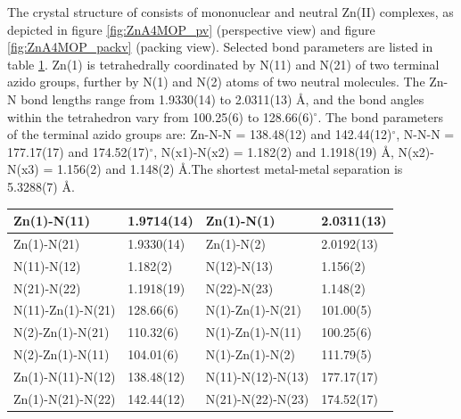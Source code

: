 The crystal structure of \ce{[Zn(N_3)_2(4-MeOpy)_2]} consists of mononuclear and neutral Zn(II) complexes, as depicted in figure \ref{fig:ZnA4MOP_pv} (perspective view) and figure \ref{fig:ZnA4MOP_packv} (packing view). Selected bond parameters are listed in table \ref{batab:ZnA4MOP}.  Zn(1) is tetrahedrally coordinated by N(11) and N(21) of two terminal azido groups, further by N(1) and N(2) atoms of two neutral  molecules. The Zn-N bond lengths range from 1.9330(14) to 2.0311(13) \AA, and the bond angles within the  tetrahedron vary from 100.25(6) to 128.66(6)$^\circ$. The bond parameters of the terminal azido groups are: Zn-N-N = 138.48(12) and 142.44(12)$^\circ$, N-N-N = 177.17(17) and 174.52(17)$^\circ$, N(x1)-N(x2) = 1.182(2) and 1.1918(19) \AA, N(x2)-N(x3) = 1.156(2) and 1.148(2) \AA.The shortest metal-metal separation is 5.3288(7) \AA. 

\begin{table}[htpb!]
\centering
{}
\begin{tabular}{|l|l|l|l|}
\hline
Zn(1)-N(11) & 1.9714(14) & Zn(1)-N(1) & 2.0311(13)\\
\hline
Zn(1)-N(21) & 1.9330(14) & Zn(1)-N(2) & 2.0192(13)\\
\hline
N(11)-N(12) & 1.182(2) & N(12)-N(13) & 1.156(2)\\
\hline
N(21)-N(22) & 1.1918(19) & N(22)-N(23) & 1.148(2)\\
\hline
\hline
N(11)-Zn(1)-N(21) & 128.66(6) & N(1)-Zn(1)-N(21) & 101.00(5)\\
\hline
N(2)-Zn(1)-N(21) & 110.32(6) & N(1)-Zn(1)-N(11) & 100.25(6)\\
\hline
N(2)-Zn(1)-N(11) & 104.01(6) & N(1)-Zn(1)-N(2) & 111.79(5)\\
\hline
Zn(1)-N(11)-N(12) & 138.48(12) & N(11)-N(12)-N(13) & 177.17(17)\\
\hline
Zn(1)-N(21)-N(22) & 142.44(12) & N(21)-N(22)-N(23) & 174.52(17)\\
\hline
\end{tabular}

\label{batab:ZnA4MOP}
\end{table}



